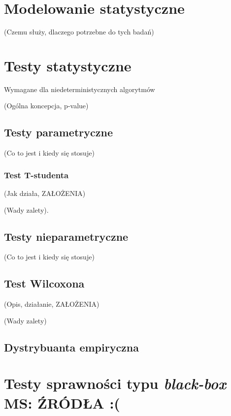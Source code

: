 \documentclass[12pt,a4paper]{report}
\begin{document}
{{{\section{Modelowanie statystyczne}
\par{
(Czemu służy, dlaczego potrzebne do tych badań)
}
\section{Testy statystyczne}
\par{
Wymagane dla niedeterministycznych algorytmów
}
\par{
(Ogólna koncepcja, p-value)
}
\subsection{Testy parametryczne}
\par{
(Co to jest i kiedy się stosuje)
}
\subsubsection{Test T-studenta}
\par{
(Jak działa, ZAŁOŻENIA)
}
\par{
(Wady zalety).
}

\subsection{Testy nieparametryczne}
\par{
(Co to jest i kiedy się stosuje)
}
\subsection{Test Wilcoxona}
\label{Wilcoxon}
\par{
(Opis, działanie, ZAŁOŻENIA)
}
\par{
(Wady zalety)
}
\subsection{Dystrybuanta empiryczna}
\section{Testy sprawności typu \emph{black-box} MS: ŹRÓDŁA :(}
}}}
\end{document}
